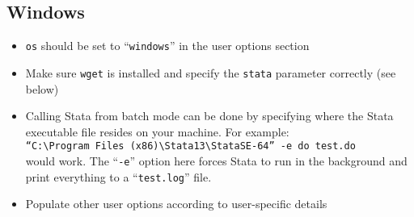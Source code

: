 \documentclass{article}
\begin{document}
\subsection{Windows}
	\begin{itemize}
	\item {\tt os} should be set to ``{\tt windows}'' in the user options section
	\item Make sure {\tt wget} is installed and specify the {\tt stata} parameter correctly (see below)
	\item Calling Stata from batch mode can be done by specifying where the Stata executable file resides on your machine. For example: \\
	{\tt ``C:{\textbackslash}Program Files (x86){\textbackslash}Stata13{\textbackslash}StataSE-64'' -e do test.do}\\
	would work. The ``{\tt -e}'' option here forces Stata to run in the background and print everything to a ``{\tt test.log}'' file.
	\item Populate other user options according to user-specific details
	\end{itemize}
\end{document}
